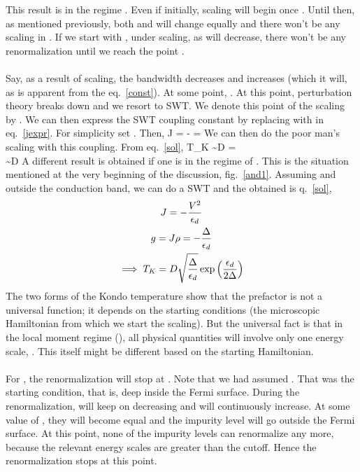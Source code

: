 \documentclass[14pt]{extarticle}
\numberwithin{equation}{section}
\begin{document}
This result is in the regime . Even if  initially, scaling will begin once . Until then, as mentioned previously, both  and  will change equally and there won't be any scaling in . If we start with , under scaling, as  will decrease, there won't be any renormalization until we reach the point .\\\\
Say, as a result of scaling, the bandwidth decreases and  increases (which it will, as is apparent from the eq.~\ref{const}). At some point, . At this point, perturbation theory breaks down and we resort to SWT. We denote this point of the scaling by . We can then express the SWT coupling constant  by replacing  with  in eq.~\ref{jexpr}. For simplicity set . Then,
\beq[historia]
\wl J = - = 
\eeq
We can then do the poor man's scaling with this coupling. From eq.~\ref{sol},
\beq
T_K \sim D   = \\
\sim D
\eeq
A different result is obtained if one is in the regime of . This is the situation mentioned at the very beginning of the discussion, fig.~\ref{and1}. Assuming  and  outside the conduction band, we can do a SWT and the  obtained is q.~\ref{sol},
\begin{gather}
	J = -\frac{V^2}{\epsilon_d}\\
	g = J\rho = -\frac{\Delta}{\epsilon_d}\\
	\implies T_K = D\sqrt{\frac{\Delta}{\epsilon_d}}\exp\left({\frac{\epsilon_d}{2\Delta}}\right)\label{jean2}
\end{gather}
The two forms of the Kondo temperature show that the prefactor is not a universal function; it depends on the starting conditions (the microscopic Hamiltonian from which we start the scaling). But the universal fact is that in the local moment regime (), all physical quantities will involve only one energy scale, . This  itself might be different based on the starting Hamiltonian.\\\\
For , the renormalization will stop at . Note that we had assumed . That was the starting condition, that is,  deep inside the Fermi surface. During the renormalization,  will keep on decreasing and  will continuously increase. At some value of , they will become equal and the impurity level will go outside the Fermi surface. At this point, none of the impurity levels can renormalize any more, because the relevant energy scales are greater than the cutoff. Hence the renormalization stops at this point.
\end{document}
